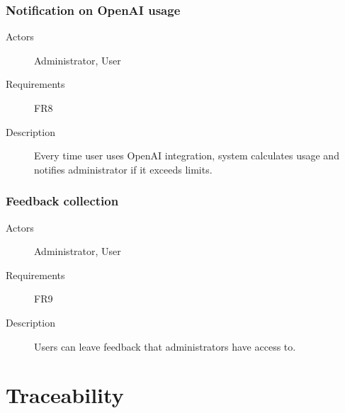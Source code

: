 \documentclass[
    english, %
]{VUMIFPSkursinis}
\begin{document}
\subsubsection{Notification on OpenAI usage}

\begin{description}
    \item[Actors] Administrator, User
    \item[Requirements] FR8
    \item[Description] Every time user uses OpenAI integration, system calculates usage and notifies administrator if it exceeds limits.
\end{description}

\subsubsection{Feedback collection}

\begin{description}
    \item[Actors] Administrator, User
    \item[Requirements] FR9
    \item[Description] Users can leave feedback that administrators have access to.
\end{description}

\section{Traceability}

\listoffigures
\printbibliography[heading=bibintoc]
\end{document}
